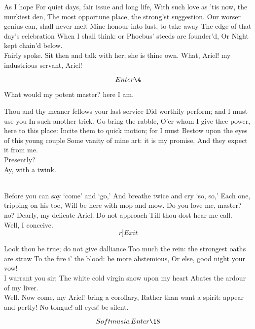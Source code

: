 \documentclass[11pt]{book}
\begin{document}
\3	As I hope
	For quiet days, fair issue and long life,
	With such love as 'tis now, the murkiest den,
	The most opportune place, the strong'st suggestion.
	Our worser genius can, shall never melt
	Mine honour into lust, to take away
	The edge of that day's celebration
	When I shall think: or Phoebus' steeds are founder'd,
	Or Night kept chain'd below. \\

\1	Fairly spoke.
	Sit then and talk with her; she is thine own.
	What, Ariel! my industrious servant, Ariel!

	\[Enter \4\]

\4	What would my potent master? here I am.

\1	Thou and thy meaner fellows your last service
	Did worthily perform; and I must use you
	In such another trick. Go bring the rabble,
	O'er whom I give thee power, here to this place:
	Incite them to quick motion; for I must
	Bestow upon the eyes of this young couple
	Some vanity of mine art: it is my promise,
	And they expect it from me. \\

\4	Presently? \\

\1	Ay, with a twink.

\4	\\
   {\Locus \textus {+3em}
   Before you can say `come' and `go,'
	And breathe twice and cry `so, so,'
	Each one, tripping on his toe,
	Will be here with mop and mow.
	Do you love me, master? no?
}
\1	Dearly, my delicate Ariel. Do not approach
	Till thou dost hear me call. \\

\4	Well, I conceive. \[r]Exit\]

\1	Look thou be true; do not give dalliance
	Too much the rein: the strongest oaths are straw
	To the fire i' the blood: be more abstemious,
	Or else, good night your vow! \\

\3	I warrant you sir;
	The white cold virgin snow upon my heart
	Abates the ardour of my liver. \\

\1	Well.
	Now come, my Ariel! bring a corollary,
	Rather than want a spirit: appear and pertly!
	No tongue! all eyes! be silent.


	\[Soft music. Enter \18\]
\end{document}
